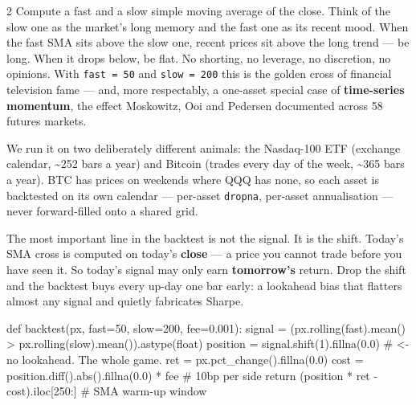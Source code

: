 \documentclass{pyportfolios-note}
\begin{document}
\begin{multicols}{2}
Compute a fast and a slow simple moving average of the close. Think of the slow
one as the market's long memory and the fast one as its recent mood. When the
fast SMA sits above the slow one, recent prices sit above the long trend — be
long. When it drops below, be flat. No shorting, no leverage, no discretion, no
opinions. With \texttt{fast = 50} and \texttt{slow = 200} this is the golden
cross of financial television fame — and, more respectably, a one-asset special
case of \textbf{time-series momentum}, the effect Moskowitz, Ooi and Pedersen
documented across 58 futures markets.

We run it on two deliberately different animals: the Nasdaq-100 ETF (exchange
calendar, \textasciitilde252 bars a year) and Bitcoin (trades every day of the
week, \textasciitilde365 bars a year). BTC has prices on weekends where QQQ has
none, so each asset is backtested on its own calendar — per-asset
\texttt{dropna}, per-asset annualisation — never forward-filled onto a shared
grid.
\end{multicols}


\noteneedroom{190bp}

The most important line in the backtest is not the signal. It is the shift.
Today's SMA cross is computed on today's \textbf{close} — a price you cannot
trade before you have seen it. So today's signal may only earn
\textbf{tomorrow's} return. Drop the shift and the backtest buys every up-day one
bar early: a lookahead bias that flatters almost any signal and quietly
fabricates Sharpe.

\begin{notecode}
def backtest(px, fast=50, slow=200, fee=0.001):
    signal   = (px.rolling(fast).mean() > px.rolling(slow).mean()).astype(float)
    position = signal.shift(1).fillna(0.0)   # <- no lookahead. The whole game.
    ret      = px.pct_change().fillna(0.0)
    cost     = position.diff().abs().fillna(0.0) * fee   # 10bp per side
    return (position * ret - cost).iloc[250:]   # SMA warm-up window
\end{notecode}
\end{document}
